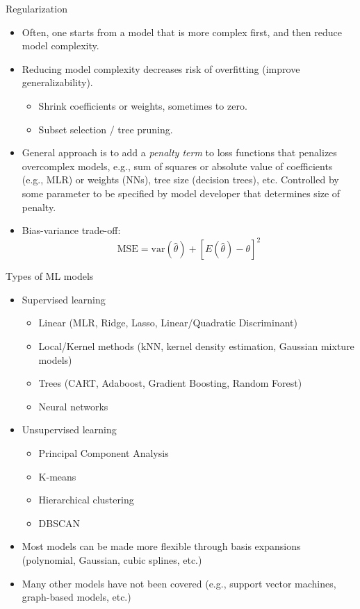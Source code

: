 \documentclass[aspectratio=169]{beamer}
\begin{document}
\begin{frame}{Regularization}
    \begin{itemize}
        \item Often, one starts from a model that is more complex first, and then reduce model complexity.
        \item Reducing model complexity decreases risk of overfitting (improve generalizability).
        \begin{itemize}
            \item Shrink coefficients or weights, sometimes to zero.
            \item Subset selection / tree pruning.
        \end{itemize}
        \item General approach is to add a \textit{penalty term} to loss functions that penalizes overcomplex models, e.g., sum of squares or absolute value of coefficients (e.g., MLR) or weights (NNs), tree size (decision trees), etc. Controlled by some parameter to be specified by model developer that determines size of penalty.
        \item Bias-variance trade-off:
        \begin{equation*}
            \mathrm{MSE} = \mathrm{var}(\hat{\theta}) + [E(\hat{\theta}) - \theta]^2
        \end{equation*}
    \end{itemize}
\end{frame}


\begin{frame}{Types of ML models}
    \begin{itemize}
        \item Supervised learning
        \begin{itemize}
            \item Linear (MLR, Ridge, Lasso, Linear/Quadratic Discriminant)
            \item Local/Kernel methods (kNN, kernel density estimation, Gaussian mixture models)
            \item Trees (CART, Adaboost, Gradient Boosting, Random Forest)
            \item Neural networks
        \end{itemize}
        \item Unsupervised learning
        \begin{itemize}
            \item Principal Component Analysis
            \item K-means
            \item Hierarchical clustering
            \item DBSCAN
        \end{itemize}
        \item Most models can be made more flexible through basis expansions (polynomial, Gaussian, cubic splines, etc.)
        \item Many other models have not been covered (e.g., support vector machines, graph-based models, etc.)
    \end{itemize}
\end{frame}
\end{document}
